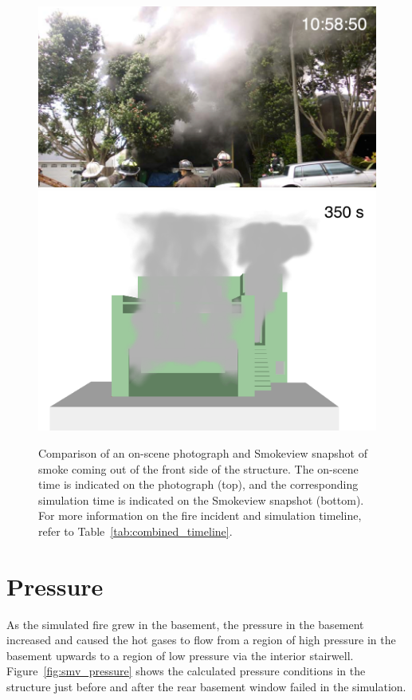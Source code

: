 \documentclass[12pt,oneside]{book}
\begin{document}
\begin{figure}[!ht]
\includegraphics[width=5.0in]{../Figures/Photo_Front_350_s}
\includegraphics[width=5.0in]{../Figures/SMV_Front_350_s}
\caption[Snapshot of smoke coming out of the front side of the structure.]
{Comparison of an on-scene photograph and Smokeview snapshot of smoke coming out of the front side of the structure. The on-scene time is indicated on the photograph (top), and the corresponding simulation time is indicated on the Smokeview snapshot (bottom). For more information on the fire incident and simulation timeline, refer to Table~\ref{tab:combined_timeline}.}
\label{fig:timeline_comparison_front}
\end{figure}


\clearpage


\section{Pressure}
\label{sec:pressure}

As the simulated fire grew in the basement, the pressure in the basement increased and caused the hot gases to flow from a region of high pressure in the basement upwards to a region of low pressure via the interior stairwell. Figure~\ref{fig:smv_pressure} shows the calculated pressure conditions in the structure just before and after the rear basement window failed in the simulation.
\end{document}
